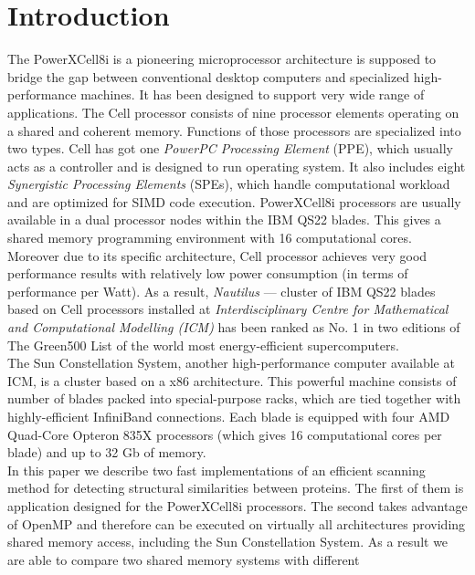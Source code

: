 \section{Introduction}
The PowerXCell8i is a pioneering microprocessor architecture
is supposed to bridge the gap between conventional desktop computers and
specialized high-performance machines.
It has been designed to support very wide range of applications.
The Cell processor consists of nine processor elements operating on a
shared and coherent memory.
Functions of those processors are specialized into two types.
Cell has got one \emph{PowerPC Processing Element} (PPE), which usually acts
as a controller and is designed to run operating system.
It also includes eight \emph{Synergistic Processing Elements} (SPEs), which
handle computational workload and are optimized for SIMD code execution.
PowerXCell8i processors are usually available in a dual processor nodes within
the IBM QS22 blades.
This gives a shared memory programming environment with 16
computational cores.
Moreover due to its specific architecture, Cell processor achieves very good
performance results with relatively low power consumption (in terms of
performance per Watt).
As a result, \emph{Nautilus} \cite{nau} --- cluster of IBM QS22 blades based on
Cell processors installed at \emph{Interdisciplinary Centre for Mathematical and
Computational Modelling (ICM)} has been ranked as No. 1 in two editions of
The Green500 List \cite{g500} of the world most energy-efficient supercomputers.\\
The Sun Constellation System, another high-performance computer available at ICM,
is a cluster based on a x86 architecture.
This powerful machine consists of number of blades packed into special-purpose
racks, which are tied together with highly-efficient InfiniBand connections.
Each blade is equipped with four AMD Quad-Core Opteron 835X processors (which
gives 16 computational cores per blade) and up to 32 Gb of memory.\\
In this paper we describe two fast implementations of an efficient scanning
method for detecting structural similarities between proteins.
The first of them is application designed for the PowerXCell8i processors.
The second takes advantage of OpenMP and therefore can be executed on
virtually all architectures providing shared memory access, including the Sun
Constellation System.
As a result we are able to compare two shared memory systems with different
